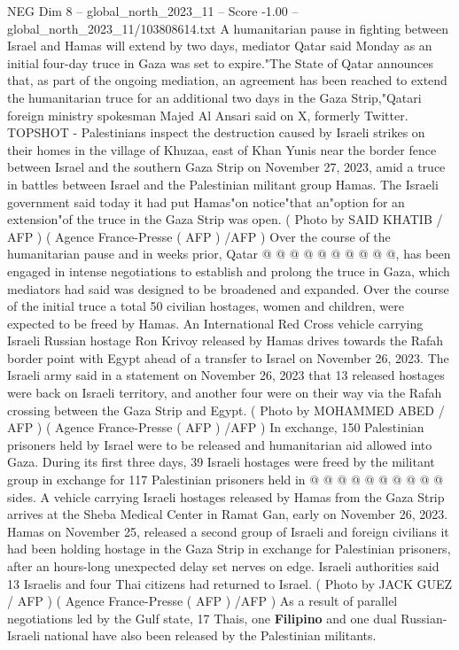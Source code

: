 \begin{textsample}{NEG Dim 8 – global\_north\_2023\_11 – Score -1.00 – global\_north\_2023\_11/103808614.txt}  \label{ex:f8_neg_266}
A humanitarian pause in fighting between Israel and Hamas will extend by two days, mediator Qatar said Monday as an initial four-day truce in Gaza was set to expire."The State of Qatar announces that, as part of the ongoing mediation, an agreement has been reached to extend the humanitarian truce for an additional two days in the Gaza Strip,"Qatari foreign ministry spokesman Majed Al Ansari said on X, formerly Twitter.
TOPSHOT - Palestinians inspect the destruction caused by Israeli strikes on their homes in the village of Khuzaa, east of Khan Yunis near the border fence between Israel and the southern Gaza Strip on November 27, 2023, amid a truce in battles between Israel and the Palestinian militant group Hamas.
The Israeli government said today it had put Hamas"on notice"that an"option for an extension"of the truce in the Gaza Strip was open. ( Photo by SAID KHATIB / AFP ) ( Agence France-Presse ( AFP ) /AFP ) Over the course of the humanitarian pause and in weeks prior, Qatar @ @ @ @ @ @ @ @ @ @, has been engaged in intense negotiations to establish and prolong the truce in Gaza, which mediators had said was designed to be broadened and expanded.
Over the course of the initial truce a total 50 civilian hostages, women and children, were expected to be freed by Hamas.
An International Red Cross vehicle carrying Israeli Russian hostage Ron Krivoy released by Hamas drives towards the Rafah border point with Egypt ahead of a transfer to Israel on November 26, 2023.
The Israeli army said in a statement on November 26, 2023 that 13 released hostages were back on Israeli territory, and another four were on their way via the Rafah crossing between the Gaza Strip and Egypt. ( Photo by MOHAMMED ABED / AFP ) ( Agence France-Presse ( AFP ) /AFP ) In exchange, 150 Palestinian prisoners held by Israel were to be released and humanitarian aid allowed into Gaza.
During its first three days, 39 Israeli hostages were freed by the militant group in exchange for 117 Palestinian prisoners held in @ @ @ @ @ @ @ @ @ @ sides.
A vehicle carrying Israeli hostages released by Hamas from the Gaza Strip arrives at the Sheba Medical Center in Ramat Gan, early on November 26, 2023.
Hamas on November 25, released a second group of Israeli and foreign civilians it had been holding hostage in the Gaza Strip in exchange for Palestinian prisoners, after an hours-long unexpected delay set nerves on edge.
Israeli authorities said 13 Israelis and four Thai citizens had returned to Israel. ( Photo by JACK GUEZ / AFP ) ( Agence France-Presse ( AFP ) /AFP ) As a result of parallel negotiations led by the Gulf state, 17 Thais, one \textbf{Filipino} and one dual Russian-Israeli national have also been released by the Palestinian militants.

\end{textsample}
